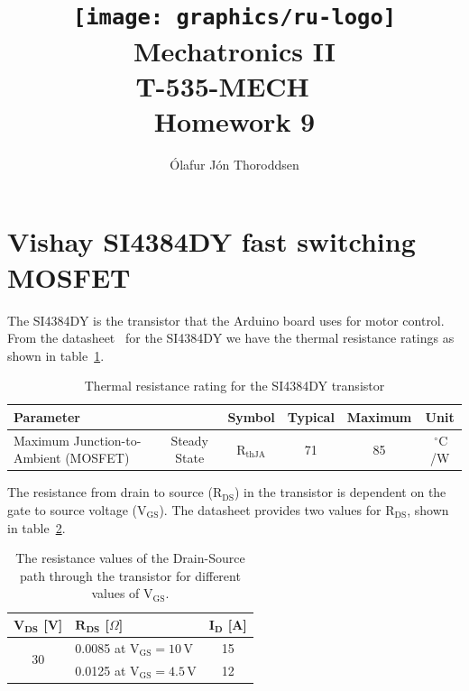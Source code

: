 \documentclass[11pt,a4paper,titlepage]{article}
\author{Ólafur Jón Thoroddsen}  %
\title{\texttt{[image: graphics/ru-logo]}\\\vspace{10mm}
	Mechatronics II\\T-535-MECH \ \\Homework 9}  %
\newcommand{\V}{\,\textrm{V}}
\newcommand{\degC}{\,^{\circ}\text{C}}
\begin{document}
	\maketitle
	
	\tableofcontents
	\pagebreak
	
	\section{Vishay SI4384DY fast switching MOSFET}
	
	The SI4384DY is the transistor that the Arduino board uses for motor control. From the datasheet~\cite{si4384dy} for the SI4384DY we have the thermal resistance ratings as shown in table~\ref{tab:thermal}.
	
	\begin{table}[h]
		\centering
		\hspace*{-2.7cm}
		\begin{tabular}{lccccc}
			\toprule
			\textbf{Parameter}	&	&	\textbf{Symbol}	&	\textbf{Typical}	&	\textbf{Maximum}	&	\textbf{Unit}\\
			\midrule
			Maximum Junction-to-Ambient (MOSFET)	&	Steady State	&	$\text{R}_{\text{thJA}}$	&	71	&	85	&	$\degC$/W\\	
			\bottomrule
		\end{tabular}
		\caption{Thermal resistance rating for the SI4384DY transistor}
		\label{tab:thermal}
	\end{table}
	\vspace{5mm}
	
	\noindent The resistance from drain to source ($\text{R}_{\text{DS}}$) in the transistor is dependent on the gate to source voltage ($\text{V}_{\text{GS}}$). The datasheet provides two values for $\text{R}_{\text{DS}}$, shown in table~\ref{tab:rds}.
	
	\vspace{5mm}
	\begin{table}[h]
		\centering
		\begin{tabular}{clc}
			\toprule
			$\textbf{V}_{\textbf{DS}}$	[V]	&	$\textbf{R}_{\textbf{DS}}$ [$\Omega$]	&	$\textbf{I}_{\textbf{D}}$ [A]\\
			\midrule
			\multirow{2}{*}{30} 	&		0.0085 at $\text{V}_{\text{GS}} = 10\V$	&	15\\
			&	0.0125 at $\text{V}_{\text{GS}} = 4.5\V$	&	12\\
			\bottomrule
		\end{tabular}
		\caption{The resistance values of the Drain-Source path through the transistor for different values of $\text{V}_{\text{GS}}$.}
		\label{tab:rds}
	\end{table}
	\vspace{5mm}
	
\end{document}
